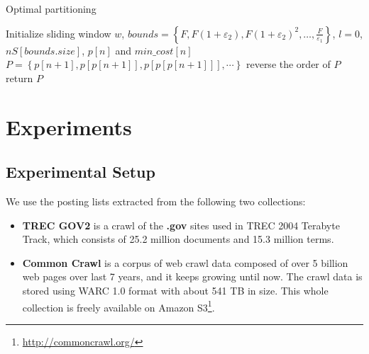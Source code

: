 \documentclass[runningheads,a4paper]{llncs}
\begin{document}
\begin{algorithm} \label{alg:optimal partition}
	\caption{Optimal partitioning}
	Initialize sliding window $ w $, $ bounds=\left\lbrace F, F(1+\varepsilon_2), F(1+\varepsilon_2)^2,\dots, \frac{F}{\varepsilon_1} \right\rbrace $, $ l=0 $, $ nS[bounds.size] $, $p\left[ n \right]$ and $min\_cost \left[n\right] $\;
	$ P=\left\lbrace p\left[n+1\right], p\left[p\left[n+1\right]\right], p\left[p\left[p\left[n+1\right]\right]\right],\cdots\right\rbrace $\;
	reverse the order of $ P $\;
	return $ P $\;
\end{algorithm}

\section{Experiments}\label{sec:experiments}
\subsection{Experimental Setup}

We use the posting lists extracted from the following two collections:
\begin{itemize}
	\item \textbf{TREC GOV2} is a crawl of the \textbf{.gov} sites used in TREC 2004 Terabyte Track, which consists of 25.2 million documents and 15.3 million terms.
	\item \textbf{Common Crawl} is a corpus of web crawl data composed of over 5 billion web pages over last 7 years, and it keeps growing until now.
	The crawl data is stored using WARC 1.0 format with about 541 TB in size.
	This whole collection is freely available on Amazon S3\footnote{\url{http://commoncrawl.org/}}.
\end{itemize}
\end{document}

